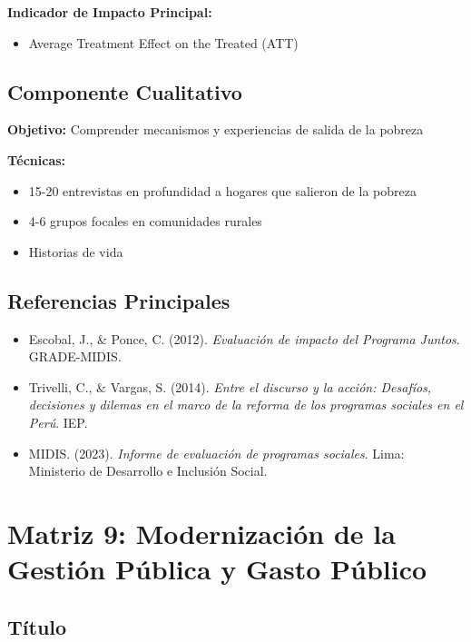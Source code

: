 \documentclass[
  man,
  floatsintext,
  longtable,
  a4paper,
  nolmodern,
  notxfonts,
  notimes,
  12pt,
  colorlinks=true,linkcolor=blue,citecolor=blue,urlcolor=blue]{apa7}
\providecommand{\tightlist}{%
  \setlength{\itemsep}{0pt}\setlength{\parskip}{0pt}}
\begin{document}
\textbf{Indicador de Impacto Principal:}

\begin{itemize}
\tightlist
\item
  Average Treatment Effect on the Treated (ATT)
\end{itemize}

\subsection{Componente Cualitativo}\label{componente-cualitativo}

\textbf{Objetivo:} Comprender mecanismos y experiencias de salida de la
pobreza

\textbf{Técnicas:}

\begin{itemize}
\tightlist
\item
  15-20 entrevistas en profundidad a hogares que salieron de la pobreza
\item
  4-6 grupos focales en comunidades rurales
\item
  Historias de vida
\end{itemize}

\subsection{Referencias Principales}\label{referencias-principales-7}

\begin{itemize}
\tightlist
\item
  Escobal, J., \& Ponce, C. (2012). \emph{Evaluación de impacto del
  Programa Juntos}. GRADE-MIDIS.
\item
  Trivelli, C., \& Vargas, S. (2014). \emph{Entre el discurso y la
  acción: Desafíos, decisiones y dilemas en el marco de la reforma de
  los programas sociales en el Perú}. IEP.
\item
  MIDIS. (2023). \emph{Informe de evaluación de programas sociales}.
  Lima: Ministerio de Desarrollo e Inclusión Social.
\end{itemize}

\section{Matriz 9: Modernización de la Gestión Pública y Gasto
Público}\label{matriz-9-modernizaciuxf3n-de-la-gestiuxf3n-puxfablica-y-gasto-puxfablico}

\subsection{Título}\label{tuxedtulo-8}
\end{document}

